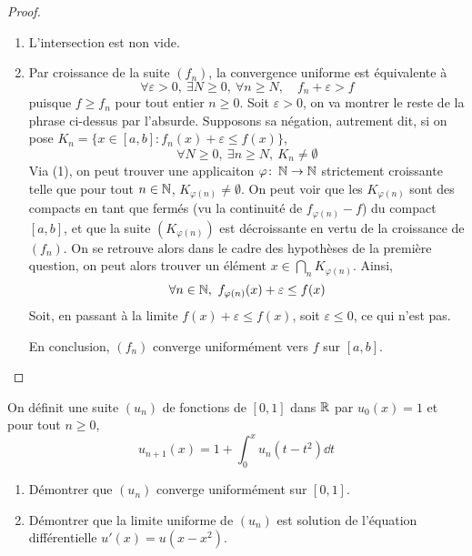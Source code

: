 \documentclass[10pt]{scrartcl}
\begin{document}
    \begin{proof}\hfill
        \begin{enumerate}
            \item L'intersection est non vide.
            \item Par croissance de la suite $(f_n)$, la convergence uniforme est équivalente à 
            \[
                \forall \varepsilon > 0,\ \exists N\geq 0,\ \forall n\geq N,\quad f_n + \varepsilon > f
            \]
            puisque $f\geq f_n$ pour tout entier $n\geq 0$. 
            Soit $\varepsilon > 0$, on va montrer le reste de la phrase ci-dessus par l'absurde. 
            Supposons sa négation, autrement dit, si on pose $K_n=\lbrace x\in[a,b]\colon f_n(x)+\varepsilon \leq f(x)\rbrace$,
            \[
                \forall N\geq 0,\ \exists n\geq N,\ K_n\neq\emptyset\tag*{(1)}
            \]
            Via (1), on peut trouver une applicaiton $\varphi\colon\operatorname{\mathbb N}\to\operatorname{\mathbb N}$ strictement croissante telle que pour tout $n\in\operatorname{\mathbb N}$, $K_{\varphi(n)}\neq\emptyset$.
            On peut voir que les $K_{\varphi(n)}$ sont des compacts en tant que fermés (vu la continuité de $f_{\varphi(n)}-f$) du compact $[a,b]$, et que la suite $(K_{\varphi(n)})$ est décroissante en vertu de la croissance de $(f_n)$.
            On se retrouve alors dans le cadre des hypothèses de la première question, on peut alors trouver un élément $x\in\bigcap_nK_{\varphi(n)}$.
            Ainsi, 
            \[
                \forall n\in\N,\ f_{\varphi(n)}(x)+\varepsilon\leq f(x)
            \]
            Soit, en passant à la limite $f(x)+\varepsilon\leq f(x)$, soit $\varepsilon\leq 0$, ce qui n'est pas.

            En conclusion, $(f_n)$ converge uniformément vers $f$ sur $[a,b]$.
        \end{enumerate}    
    \end{proof}

    \begin{exo}
        On définit une suite $(u_n)$ de fonctions de $[0,1]$ dans $\operatorname{\mathbb R}$ par $u_0(x)=1$ et pour tout $n\geq 0$, 
        \[
            u_{n+1}(x)=1+\int_0^xu_n(t-t^2)\dd t
        \]
        \begin{enumerate}
            \item Démontrer que $(u_n)$ converge uniformément sur $[0,1]$.
            \item Démontrer que la limite uniforme de $(u_n)$ est solution de l'équation différentielle $u'(x)=u(x-x^2)$.
        \end{enumerate}
    \end{exo}
\end{document}
